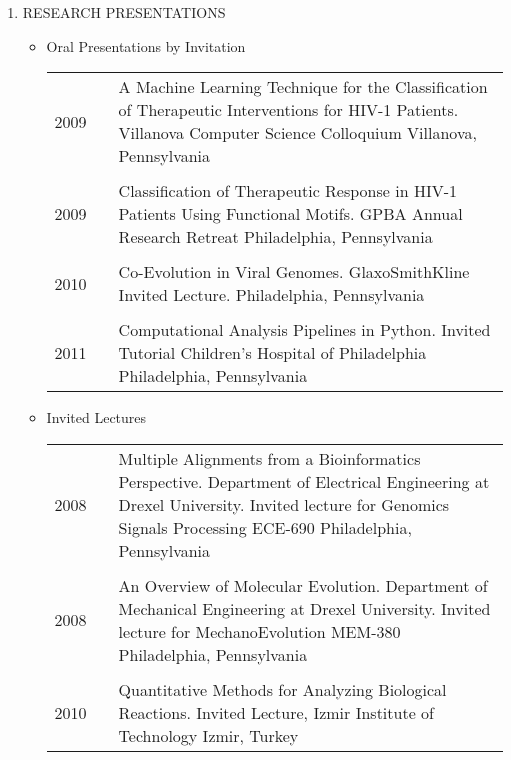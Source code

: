 \documentclass[a4paper,10pt]{article}
\begin{document}
\begin{enumerate}
\begin{itemize}
 \end{itemize}

 \item RESEARCH PRESENTATIONS
 \begin{itemize}
  \item[] Oral Presentations by Invitation
   \begin{longtable}{p{}p{}p{}}
  2009 & & A Machine Learning Technique for the Classification of Therapeutic Interventions for HIV-1 Patients. \newline Villanova Computer Science Colloquium \newline Villanova, Pennsylvania \\
  \\
  2009 & & Classification of Therapeutic Response in HIV-1 Patients Using Functional Motifs. \newline GPBA Annual Research Retreat \newline Philadelphia, Pennsylvania \\
  \\
  2010 & & Co-Evolution in Viral Genomes. \newline GlaxoSmithKline Invited Lecture. \newline 	Philadelphia, Pennsylvania \\
  \\
  2011 & & Computational Analysis Pipelines in Python. \newline Invited Tutorial Children’s Hospital of Philadelphia \newline Philadelphia, Pennsylvania \\
  \end{longtable}
  \item[] Invited Lectures
   \begin{longtable}{p{}p{}p{}}
   2008 & & Multiple Alignments from a Bioinformatics Perspective. \newline Department of Electrical Engineering at Drexel University. \newline Invited lecture for Genomics Signals Processing ECE-690 \newline 	Philadelphia, Pennsylvania \\
   \\
   2008 & & An Overview of Molecular Evolution. \newline Department of Mechanical Engineering at Drexel University. \newline Invited lecture for MechanoEvolution MEM-380 \newline Philadelphia, Pennsylvania \\
   \\
   2010 & & Quantitative Methods for Analyzing Biological Reactions. \newline Invited Lecture, Izmir Institute of Technology \newline Izmir, Turkey \\
  \end{longtable}
 \end{itemize} 
\end{enumerate}
\end{document}
